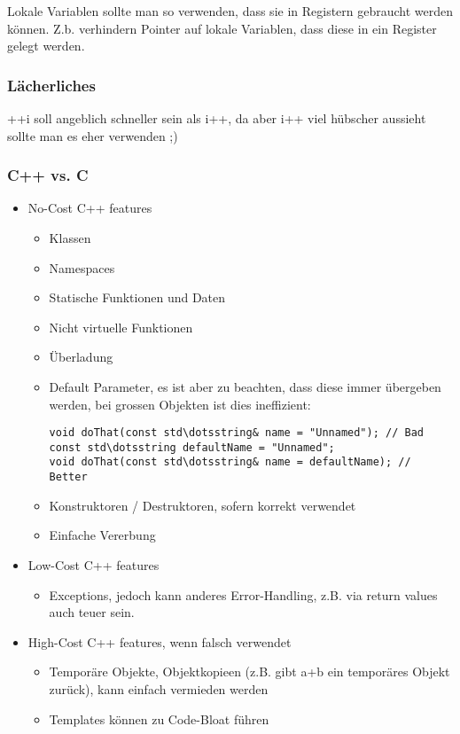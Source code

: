 Lokale Variablen sollte man so verwenden, dass sie in Registern gebraucht werden können.
Z.b. verhindern Pointer auf lokale Variablen, dass diese in ein Register gelegt werden.

\subsubsection{Lächerliches}
++i soll angeblich schneller sein als i++, da aber i++ viel hübscher aussieht sollte man es eher verwenden ;)

\subsubsection{C++ vs. C}
\begin{itemize}
	\item No-Cost C++ features
		\begin{itemize}
			\item Klassen
			\item Namespaces
			\item Statische Funktionen und Daten
			\item Nicht virtuelle Funktionen
			\item Überladung
			\item Default Parameter, es ist aber zu beachten, dass diese immer übergeben werden, bei grossen Objekten ist dies ineffizient:
				\begin{lstlisting}
void doThat(const std\dotsstring& name = "Unnamed"); // Bad
const std\dotsstring defaultName = "Unnamed";
void doThat(const std\dotsstring& name = defaultName); // Better
				\end{lstlisting}
			\item  Konstruktoren / Destruktoren, sofern korrekt verwendet
			\item Einfache Vererbung
		\end{itemize}
	\item Low-Cost C++ features
		\begin{itemize}
			\item Exceptions, jedoch kann anderes Error-Handling, z.B. via return values auch teuer sein.
		\end{itemize}
	\item High-Cost C++ features, wenn falsch verwendet
		\begin{itemize}
			\item Temporäre Objekte, Objektkopieen (z.B. gibt a+b ein temporäres Objekt zurück), kann einfach vermieden werden
			\item Templates können zu Code-Bloat führen
		\end{itemize}
\end{itemize}

